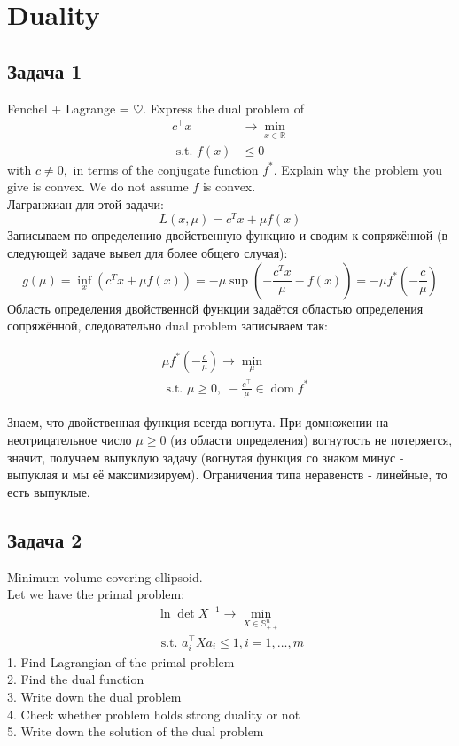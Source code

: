 \documentclass[a4paper,12pt]{article} %
\begin{document}
\newpage

\section*{Duality}
\subsection*{Задача 1}
Fenchel + Lagrange = $ \heartsuit $. Express the dual problem of
$$
\begin{aligned}
c^{\top} x & \rightarrow \min _{x \in \mathbb{R}} \\
\text { s.t. } f(x) & \leq 0
\end{aligned}
$$
with $c \neq 0,$ in terms of the conjugate function $f^{*}$. Explain why the problem you give is convex. We do not assume $f$ is convex.\\

Лагранжиан для этой задачи: 
$$L(x, \mu)=c^{T} x+\mu f(x)$$
Записываем по определению двойственную функцию и сводим к сопряжённой (в следующей задаче вывел для более общего случая):
$$
g(\mu)=\inf\limits _{x}\left(c^{T} x+\mu f(x)\right)=-\mu \sup \left(-\frac{c^{T} x}{\mu}-f(x)\right)=-\mu f^{*}\left(-\frac{c}{\mu}\right)
$$
Область определения двойственной функции задаётся областью определения сопряжённой, следовательно dual problem записываем так: 

$$
\begin{aligned}
&\mu f^{*}\left(-\frac{c}{\mu}\right)  \rightarrow \min _{\mu} \\
&\text { s.t. } \mu \geq 0, \; -\frac{c^{\top}}{\mu} \in \operatorname{dom} f^{*}
\end{aligned}
$$

Знаем, что двойственная функция всегда вогнута. При домножении на неотрицательное число $ \mu \geq 0 $ (из области определения) вогнутость не потеряется, значит, получаем выпуклую задачу (вогнутая функция со знаком минус - выпуклая и мы её максимизируем). Ограничения типа неравенств - линейные, то есть выпуклые.




\subsection*{Задача 2}
Minimum volume covering ellipsoid.\\
Let we have the primal problem:
$$
\begin{array}{l}
\ln \operatorname{det} X^{-1} \rightarrow \min\limits_{X \in \mathbb{S}_{++}^{n}} \\
\text { s.t. } a_{i}^{\top} X a_{i} \leq 1, i=1, \ldots, m
\end{array}
$$
1. Find Lagrangian of the primal problem\\
2. Find the dual function\\
3. Write down the dual problem\\
4. Check whether problem holds strong duality or not\\
5. Write down the solution of the dual problem\\
\end{document}
